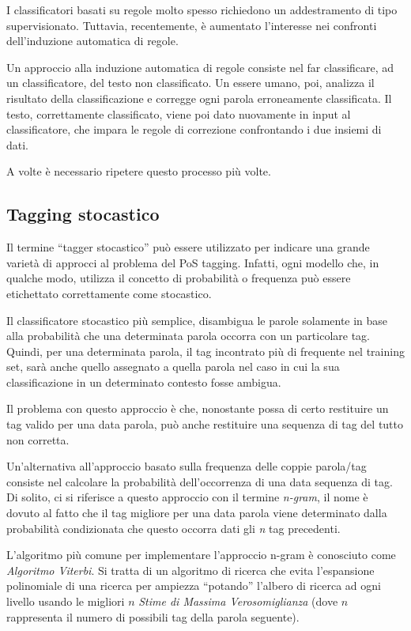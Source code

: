 I classificatori basati su regole molto spesso richiedono un addestramento di tipo supervisionato.
Tuttavia, recentemente, \`e aumentato l'interesse nei confronti dell'induzione automatica di regole.

Un approccio alla induzione automatica di regole consiste nel far classificare, ad un classificatore, del testo non classificato.
Un essere umano, poi, analizza il risultato della classificazione e corregge ogni parola erroneamente classificata.
Il testo, correttamente classificato, viene poi dato nuovamente in input al classificatore, che impara le regole di correzione confrontando i due insiemi di dati.

A volte \`e necessario ripetere questo processo pi\`u volte.

\subsection{Tagging stocastico}

Il termine ``tagger stocastico'' pu\`o essere utilizzato per indicare una grande variet\`a di approcci al problema del PoS tagging.
Infatti, ogni modello che, in qualche modo, utilizza il concetto di probabilit\`a o frequenza pu\`o essere etichettato correttamente come stocastico.

Il classificatore stocastico pi\`u semplice, disambigua le parole solamente in base alla probabilit\`a che una determinata parola occorra con un particolare tag.
Quindi, per una determinata parola, il tag incontrato pi\`u di frequente nel training set, sar\`a anche quello assegnato a quella parola nel caso in cui la sua classificazione in un determinato contesto fosse ambigua.

Il problema con questo approccio \`e che, nonostante possa di certo restituire un tag valido per una data parola, pu\`o anche restituire una sequenza di tag del tutto non corretta.

Un'alternativa all'approccio basato sulla frequenza delle coppie parola/tag consiste nel calcolare la probabilit\`a dell'occorrenza di una data sequenza di tag.
Di solito, ci si riferisce a questo approccio con il termine \emph{n-gram}, il nome \`e dovuto al fatto che il tag migliore per una data parola viene determinato dalla probabilit\`a condizionata che questo occorra dati gli \emph{n} tag precedenti.

L'algoritmo pi\`u comune per implementare l'approccio n-gram \`e conosciuto come \emph{Algoritmo Viterbi}.
Si tratta di un algoritmo di ricerca che evita l'espansione polinomiale di una ricerca per ampiezza ``potando'' l'albero di ricerca ad ogni livello usando le migliori $n$ \emph{Stime di Massima Verosomiglianza} (dove $n$ rappresenta il numero di possibili tag della parola seguente).

